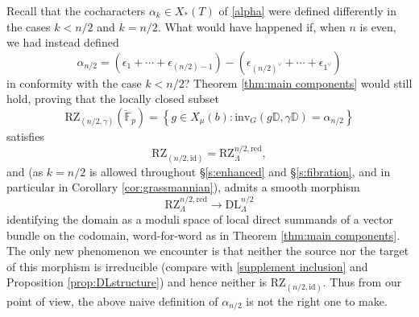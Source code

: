 \documentclass[11pt]{alggeom}
\newcommand{\red}{\mathrm{red}}
\newcommand{\F}{\mathbb F}
\begin{document}
\begin{remark}\label{rem:bad alpha}
Recall that the cocharacters $\alpha_k \in X_*(T)$ of \eqref{alpha} were defined differently in the cases $k<n/2$ and $k=n/2$. What would have happened if, when $n$ is even,  we had instead defined
\[
\alpha_{ n/2 }= (\epsilon_1+ \cdots +\epsilon_{(n/2) -1}) - (\epsilon_{( n/2 )^\vee}+ \cdots +\epsilon_{1^\vee})
\]
 in conformity with the case   $k<n/2$?
Theorem \ref{thm:main components} would still hold, proving that the locally closed subset
\[
\mathrm{RZ}_{( n/2 ,\gamma)}(\breve{\F}_p) = 
 \left\{ g \in X_\mu(b) :  \mathrm{inv}_G( g \mathbb{D} , \gamma \mathbb{D} ) = \alpha_{ n/2}  \right\} 
 \]
 satisfies
\[
\mathrm{RZ}_{( n/2 ,\mathrm{id})} = \mathrm{RZ}_\Lambda^{ n/2 ,\red} ,
\]
and (as  $k=n/2$ is allowed throughout  \S \ref{s:enhanced} and \S \ref{s:fibration}, and in particular in 
Corollary \ref{cor:grassmannian}), admits  a smooth morphism
\[
\mathrm{RZ}_\Lambda^{ n/2 ,\red} \to \mathrm{DL}_\Lambda^{n/2}
\]
identifying the domain as a moduli space of local direct summands of a vector bundle on the  codomain, word-for-word as in 
Theorem \ref{thm:main components}. 
The only new phenomenon we encounter is that neither the source nor the target of this morphism is irreducible
(compare with  \eqref{supplement inclusion} and  Proposition \ref{prop:DLstructure}) and hence neither is $\mathrm{RZ}_{( n/2 ,\mathrm{id})}$.  
Thus from our point of view,  the above naive definition of $\alpha_{n/2}$ is not the right one to make.
\end{remark}
\end{document}
